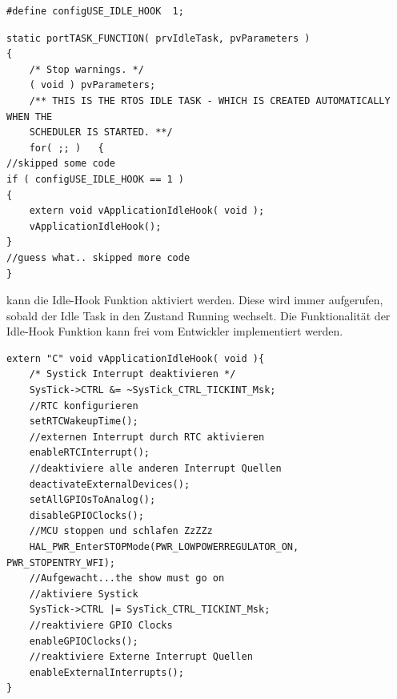 \begin{lstlisting}[label=lst:defineIdleHook, numbers = none]
#define configUSE_IDLE_HOOK  1; 
\end{lstlisting}
\begin{lstlisting}[caption={Aufruf der Idle-Hook Funktion durch den FreeRTOS Idle Task. Aus Task.c},captionpos=b, label=lst:xIdleTaskHook, float=htb!]
static portTASK_FUNCTION( prvIdleTask, pvParameters )
{
	/* Stop warnings. */
	( void ) pvParameters;
	/** THIS IS THE RTOS IDLE TASK - WHICH IS CREATED AUTOMATICALLY WHEN THE
	SCHEDULER IS STARTED. **/
	for( ;; )	{
//skipped some code
if ( configUSE_IDLE_HOOK == 1 )
{
	extern void vApplicationIdleHook( void );
	vApplicationIdleHook();
}
//guess what.. skipped more code
}     
\end{lstlisting}
kann die Idle-Hook Funktion aktiviert werden. Diese wird immer aufgerufen, sobald der Idle Task in den Zustand Running wechselt. Die Funktionalität der Idle-Hook Funktion kann frei vom Entwickler implementiert werden. 
\begin{lstlisting}[caption={Pseudocode für eine Idle-Hook Funktion},captionpos=b, label=lst:xIdleHookExamp, float=hbt!]
extern "C" void vApplicationIdleHook( void ){
	/* Systick Interrupt deaktivieren */
	SysTick->CTRL &= ~SysTick_CTRL_TICKINT_Msk;
	//RTC konfigurieren
	setRTCWakeupTime();
	//externen Interrupt durch RTC aktivieren
	enableRTCInterrupt();
	//deaktiviere alle anderen Interrupt Quellen
	deactivateExternalDevices();
	setAllGPIOsToAnalog(); 
	disableGPIOClocks();
	//MCU stoppen und schlafen ZzZZz
	HAL_PWR_EnterSTOPMode(PWR_LOWPOWERREGULATOR_ON, PWR_STOPENTRY_WFI); 
	//Aufgewacht...the show must go on
	//aktiviere Systick
	SysTick->CTRL |= SysTick_CTRL_TICKINT_Msk;
	//reaktiviere GPIO Clocks
	enableGPIOClocks();
	//reaktiviere Externe Interrupt Quellen
	enableExternalInterrupts();	
}
\end{lstlisting}
\newline  %
